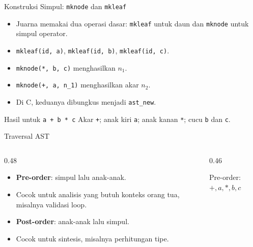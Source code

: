 \documentclass[aspectratio=169,10pt,t]{beamer}
\begin{document}
\begin{frame}{Konstruksi Simpul: \texttt{mknode} dan \texttt{mkleaf}}
  \begin{itemize}
    \item Juarna memakai dua operasi dasar: \texttt{mkleaf} untuk daun
          dan \texttt{mknode} untuk simpul operator.
    \item \texttt{mkleaf(id, a)}, \texttt{mkleaf(id, b)},
          \texttt{mkleaf(id, c)}.
    \item \texttt{mknode(*, b, c)} menghasilkan \(n_1\).
    \item \texttt{mknode(+, a, n\_1)} menghasilkan akar \(n_2\).
    \item Di C, keduanya dibungkus menjadi \texttt{ast\_new}.
  \end{itemize}

  \vspace{4pt}
  \begin{exampleblock}{Hasil untuk \texttt{a + b * c}}
    \footnotesize
    Akar \texttt{+}; anak kiri \texttt{a}; anak kanan \texttt{*};
    cucu \texttt{b} dan \texttt{c}.
  \end{exampleblock}
\end{frame}

\begin{frame}{Traversal AST}
  \begin{columns}[T,onlytextwidth]
    \begin{column}{0.48\textwidth}
      \begin{itemize}
        \item \textbf{Pre-order}: simpul lalu anak-anak.
        \item Cocok untuk analisis yang butuh konteks orang tua,
              misalnya validasi loop.
        \item \textbf{Post-order}: anak-anak lalu simpul.
        \item Cocok untuk sintesis, misalnya perhitungan tipe.
      \end{itemize}
    \end{column}
    \begin{column}{0.46\textwidth}
      \centering
      \par {\scriptsize Pre-order: \(+,a,*,b,c\)}
    \end{column}
  \end{columns}
\end{frame}
\end{document}
